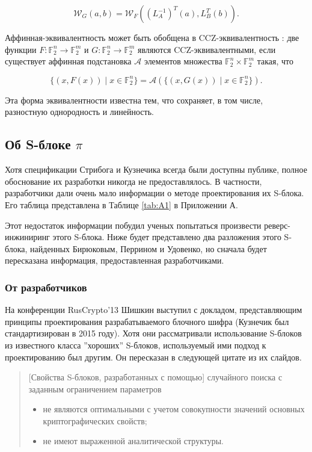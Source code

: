 \[
\mathcal{W}_G(a, b) = \mathcal{W}_F((L_A^{-1})^T(a), L_B^T(b)).
\]

Аффинная-эквивалентность может быть обобщена в CCZ-эквивалентность \cite{CCZ98}: две функции \( F: \mathbb{F}_2^n \rightarrow \mathbb{F}_2^m \) и \( G: \mathbb{F}_2^n \rightarrow \mathbb{F}_2^m \) являются CCZ-эквивалентными, если существует аффинная подстановка \( \mathcal{A} \) элементов множества \(\mathbb{F}_2^n \times \mathbb{F}_2^m\) такая, что

\[
\{(x, F(x)) \mid x \in \mathbb{F}_2^n \} = \mathcal{A}(\{(x, G(x)) \mid x \in \mathbb{F}_2^n \}).
\]

Эта форма эквивалентности известна тем, что сохраняет, в том числе, разностную однородность и линейность.

\subsection{Об S-блоке \(\pi\)}

Хотя спецификации Стрибога и Кузнечика всегда были доступны публике, полное обоснование их разработки никогда не предоставлялось. В частности, разработчики дали очень мало информации о методе проектирования их S-блока. Его таблица представлена в Таблице \ref{tab:A1} в Приложении А.

Этот недостаток информации побудил ученых попытаться произвести реверс-инжиниринг этого S-блока. Ниже будет представлено два разложения этого S-блока, найденных Бирюковым, Перрином и Удовенко, но сначала будет пересказана информация, предоставленная разработчиками.

\subsubsection{От разработчиков}

На конференции RusCrypto'13 \cite{Shi13} Шишкин выступил с докладом, представляющим принципы проектирования разрабатываемого блочного шифра (Кузнечик был стандартизирован в 2015 году). Хотя они рассматривали использование S-блоков из известного класса ''хороших'' S-блоков, используемый ими подход к проектированию был другим. Он пересказан в следующей цитате из их слайдов.

\begin{quote}
[Свойства S-блоков, разработанных с помощью] случайного поиска с заданным ограничением параметров
\begin{itemize}
        \item не являются оптимальными с учетом совокупности значений основных криптографических свойств;
        \item не имеют выраженной аналитической структуры.
\end{itemize}
\end{quote}

